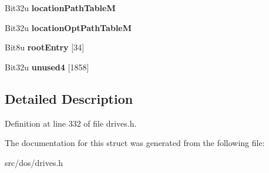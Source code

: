 \begin{DoxyCompactItemize}
\item 
\hypertarget{structisoPVD_ac7c7394e29ebb216df4029953ab6b337}{Bit32u {\bfseries location\-Path\-Table\-M}}\label{structisoPVD_ac7c7394e29ebb216df4029953ab6b337}

\item 
\hypertarget{structisoPVD_a69bb36d8476c0029f6a33b38d1fceb21}{Bit32u {\bfseries location\-Opt\-Path\-Table\-M}}\label{structisoPVD_a69bb36d8476c0029f6a33b38d1fceb21}

\item 
\hypertarget{structisoPVD_ac597b7476c7b1e6573c8ea621c423df8}{Bit8u {\bfseries root\-Entry} \mbox{[}34\mbox{]}}\label{structisoPVD_ac597b7476c7b1e6573c8ea621c423df8}

\item 
\hypertarget{structisoPVD_a78b65797080943af3276b8f142544450}{Bit32u {\bfseries unused4} \mbox{[}1858\mbox{]}}\label{structisoPVD_a78b65797080943af3276b8f142544450}

\end{DoxyCompactItemize}


\subsection{Detailed Description}


Definition at line 332 of file drives.\-h.



The documentation for this struct was generated from the following file\-:\begin{DoxyCompactItemize}
\item 
src/dos/drives.\-h\end{DoxyCompactItemize}
